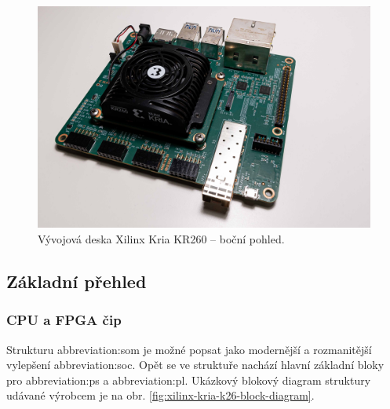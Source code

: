\documentclass[a4paper, twoside, 11pt]{article}
\begin{document}
				\begin{figure}[H]
					\centering
						\includegraphics[width=1\textwidth]{src/jpg/xilinx-kria-foto-1.jpeg} 
						\caption{Vývojová deska Xilinx Kria KR260 – boční pohled.}
						\label{fig:xilinx-kria-foto-1}
				\end{figure}

				\subsection{Základní přehled}
					\subsubsection{CPU a FPGA čip}
						Strukturu \gls{abbreviation:som} je možné popsat jako modernější a rozmanitější vylepšení \gls{abbreviation:soc}. Opět se ve struktuře nachází hlavní základní bloky pro \gls{abbreviation:ps} a \gls{abbreviation:pl}. Ukázkový blokový diagram struktury udávané výrobcem je na obr. \ref{fig:xilinx-kria-k26-block-diagram}.
\end{document}

